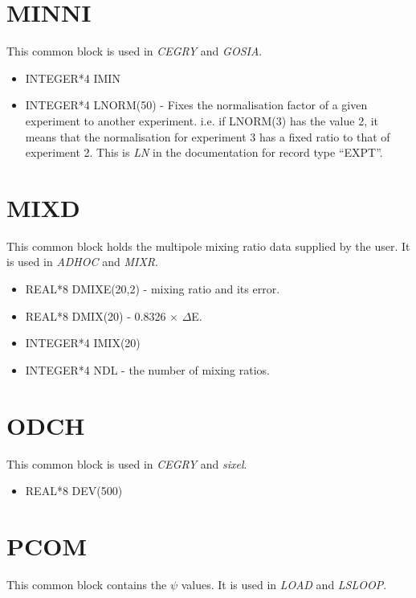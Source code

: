 \section{MINNI}

This common block is used in {\em CEGRY} and {\em GOSIA}.

\begin{itemize}
\item INTEGER*4 IMIN
\item INTEGER*4 LNORM(50) - Fixes the normalisation factor of a given
experiment to another experiment. i.e. if LNORM(3) has the value 2, it means
that the normalisation for experiment 3 has a fixed ratio to that of
experiment 2. This is {\em LN} in the documentation for record type ``EXPT''.
\end{itemize}

\section{MIXD}

This common block holds the multipole mixing ratio data supplied by the
user. It is used in {\em ADHOC} and {\em MIXR}.

\begin{itemize}
\item REAL*8 DMIXE(20,2) - mixing ratio and its error.
\item REAL*8 DMIX(20) - 0.8326 $\times$ $\Delta$E.
\item INTEGER*4 IMIX(20)
\item INTEGER*4 NDL - the number of mixing ratios.
\end{itemize}

\section{ODCH}

This common block is used in {\em CEGRY} and {\em sixel}.

\begin{itemize}
\item REAL*8 DEV(500)
\end{itemize}

\section{PCOM}

This common block contains the $\psi$ values. It is used in {\em LOAD} and
{\em LSLOOP}.

